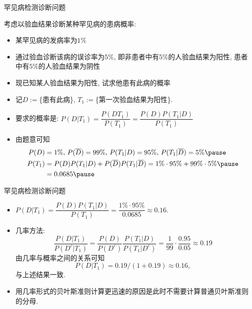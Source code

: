 \begin{frame}{罕见病检测诊断问题}
	\begin{exam}考虑以验血结果诊断某种罕见病的患病概率:
		\begin{itemize}[<+-|alert@+>]
			\item 	某罕见病的发病率为$1\%$
			\item 通过验血诊断该病的误诊率为$5\%$, 即非患者中有$5\%$的人验血结果为阳性, 患者中有$5\%$的人验血结果为阴性
			\item 现已知某人验血结果为阳性, 试求他患有此病的概率
		\end{itemize}
	\end{exam}
	\pause

	\begin{jieda}
		\begin{itemize}[<+-|alert@+>]
			\item 记$D:=$\{患有此病\}, $T_{1}:=$\{第一次验血结果为阳性\}.
			\item 要求的概率是: $P(D|T_{1})=\dfrac{P(DT_{1})}{P(T_{1})}=\dfrac{P(D)P(T_{1}|D)}{P(T_{1})}$
			\item 由题意可知%
			\begin{align*}
				P(D)&=1\%,\,P(\overline{D})=99\%, \, P(T_{1}|D)=95\%,\,P(T_{1}|\overline{D})=5\%\pause \\
				P(T_{1})&=P(D)P(T_{1}|D)+P(\overline{D})P(T_{1}|\overline{D})=1\%\cdot 95\%+99\%\cdot 5\% \pause \\
        &=0.0685\pause
			\end{align*}
		\end{itemize}
	\end{jieda}
\end{frame}

			\begin{frame}{罕见病检测诊断问题}
				\begin{itemize}[<+-|alert@+>]

			\item
			$P(D|T_{1})=\dfrac{P(D)P(T_{1}|D)}{P(T_{1})}=\dfrac{1\%\cdot 95\%}{0.0685}\approx 0.16.$
		    \item 几率方法:
			$$\frac{P(D|T_1)}{P(D^c|T_1)}=\frac{P(D)}{P(D^c)}\frac{P(T_1|D)}{P(T_1|D^c)}=\frac{1}{99}\cdot\frac{0.95}{0.05}\approx 0.19$$
			\pause
			由几率与概率之间的关系可知
			$$P(D|T_1)=0.19/(1+0.19)\approx 0.16, $$ 与上述结果一致.
			\item 用几率形式的贝叶斯准则计算更迅速的原因是此时不需要计算普通贝叶斯准则的分母.
		\end{itemize}
\end{frame}


